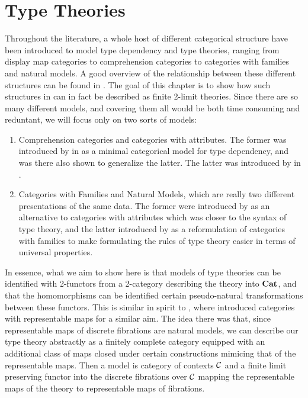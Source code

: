 \documentclass[../thesis.tex]{subfiles}
\begin{document}
\chapter{Type Theories}
Throughout the literature, a whole host of different categorical structure have been introduced to model
type dependency and type theories, ranging from display map categories to comprehension categories to
categories with families and natural models. A good overview of the relationship between these different
structures can be found in \cite{ahrens2024}. The goal of this chapter is to show how such structures in
can in fact be described as finite 2-limit theories. Since there are so many different models, and covering
them all would be both time consuming and reduntant, we will focus only on two sorts of models:
\begin{enumerate}
  \item Comprehension categories and categories with attributes. The former was introduced by \citeauthor{jacobs1993}
    in \cite{jacobs1993} as a minimal categorical model for type dependency, and was there also shown to generalize
    the latter. The latter was introduced by \citeauthor{cartmell1984} in \cite{cartmell1984}.
  \item Categories with Families and Natural Models, which are really two different presentations of the same data.
    The former were introduced by \citeauthor{dybjer1996} as an alternative to categories with attributes which was
    closer to the syntax of type theory, and the latter introduced by \citeauthor{awodey2017} as a reformulation of
    categories with families to make formulating the rules of type theory easier in terms of universal properties.
\end{enumerate}

In essence, what we aim to show here is that models of type theories can be identified with 2-functors from a
2-category describing the theory into ${\mathbf{Cat}}$, and that the homomorphisms can be identified certain pseudo-natural
transformations between these functors. This is similar in spirit to \cite{uemura2023}, where \citeauthor{uemura2023}
introduced categories with representable maps for a similar aim. The idea there was that, since representable maps of
discrete fibrations are natural models, we can describe our type theory abstractly as a finitely complete
category equipped with an additional class of maps closed under certain constructions mimicing that of
the representable maps. Then a model is category of contexts ${\mathcal{C}}$ and a finite limit preserving functor
into the discrete fibrations over ${\mathcal{C}}$ mapping the representable maps of the theory to representable
maps of fibrations. 
\end{document}
